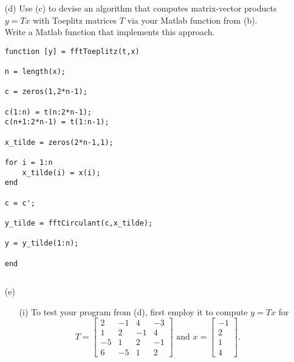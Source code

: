 \documentclass[12pt]{article}
\begin{document}
\begin{itemize}
\begin{proof}
Thus, for any given Toeplitz matrix $T$ there is a unique circulant matrix $C$ such that $T$ is the leading principal $n\times n$ submatrix of $C$.
		
 \end{proof}
 \bigskip
 \item[(d)] Use (c) to devise an algorithm that computes matrix-vector products $y=Tx$ with Toeplitz matrices $T$ via your Matlab function from (b).\\
 Write a Matlab function that implements this approach.\\
 
\lstset{language=matlab,frame=single}
\begin{lstlisting}[caption=Toeplitz Matrix-Vector Product Function]
function [y] = fftToeplitz(t,x)

n = length(x);

c = zeros(1,2*n-1);

c(1:n) = t(n:2*n-1);
c(n+1:2*n-1) = t(1:n-1);

x_tilde = zeros(2*n-1,1);

for i = 1:n
    x_tilde(i) = x(i);
end

c = c';

y_tilde = fftCirculant(c,x_tilde);

y = y_tilde(1:n);

end
\end{lstlisting}
 $\text{ }$ \\
 
 \item[(e)] $\text{ }$\\
 \begin{itemize}
 \item[(i)] To test your program from (d), first employ it to compute $y=Tx$ for 
 $$T = \begin{bmatrix}
 		2 & -1 & 4 & -3 \\
 		1 & 2 & -1 & 4 \\
 		-5 & 1 & 2 & -1 \\
 		6 & -5 & 1 & 2
 		\end{bmatrix}
 \text{ and } x = \begin{bmatrix}
 					-1 \\
 					2 \\
 					1 \\
 					4
 					\end{bmatrix}.$$\\
 

\end{itemize}
\end{itemize}
\end{document}
